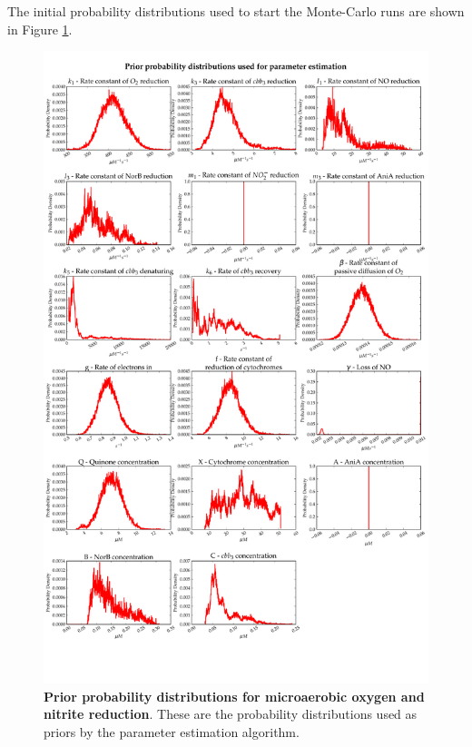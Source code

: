 The initial probability distributions used to start the Monte-Carlo runs are shown in Figure \ref{fig:nitrite_priors1}.

\begin{figure}[tbp]
 \centering
 \includegraphics[width=15cm, trim=0cm 4cm 0cm 0cm, clip=true]{./07-nitritereduction/data/priors1.pdf}
 \caption[Prior probability distributions for microaerobic oxygen and nitrite reduction]{{\bf Prior probability distributions for microaerobic oxygen and nitrite reduction}. These are the probability distributions used as priors by the parameter estimation algorithm.
 \label{fig:nitrite_priors1}}
\end{figure}
\afterpage{\clearpage}

